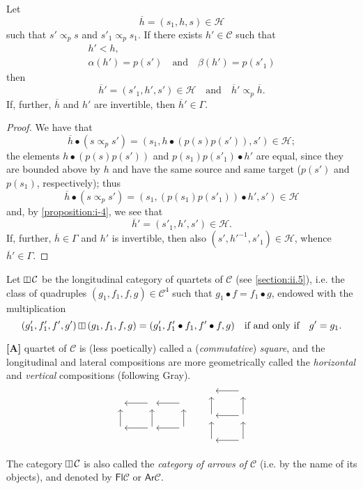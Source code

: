 \documentclass[a4paper,fleqn]{article}
\theoremstyle{plain}
\newenvironment{proposition}[1]
  {\renewcommand\theinnerproposition{#1}\innerproposition}
  {\endinnerproposition}
\theoremstyle{definition}
\newenvironment{longcomm}[1]
  {\noindent\textbf{[#1]}\rmfamily}
  {}
\newcommand{\oldpage}[1]{{\marginpar{\footnotesize$\bigg\vert$\,\,\,\,\textit{p.~#1}}}}
\newcommand{\textand}{\quad\text{and}\quad}
\newcommand{\CC}{\mathcal{C}}
\newcommand{\HH}{\mathcal{H}}
\newcommand{\subs}{\mathrel{\propto}}
\newcommand{\vsqbox}{{\rotatebox{90}{$\boxminus$}}}
\DeclareMathOperator{\vsq}{\raisebox{-.1em}{$\vsqbox$}}
\newcommand{\vmult}{\mathbin{\raisebox{-.1em}{$\vsqbox$}}}
\begin{document}
\begin{proposition}{7}
\label{proposition:i-7}
  Let
  \[
    \overline{h}
    = (s_1,h,s)
    \in\HH
  \]
  such that $s'\subs_p s$ and $s'_1\subs_p s_1$.
  If there exists $h'\in\CC$ such that
  \[
    \begin{gathered}
      h'<h,
    \\\alpha(h')=p(s')
      \textand
      \beta(h')=p(s'_1)
    \end{gathered}
  \]
  then
  \[
    \overline{h}'
    =(s'_1,h',s')
    \in\HH
    \textand
    \overline{h}'\subs_p\overline{h}.
  \]
  If, further, $\overline{h}$ and $h'$ are invertible, then $\overline{h}'\in\Gamma$.
\end{proposition}

\begin{proof}
  We have that
  \[
    \overline{h}\bullet(s\subs_p s')
    = (s_1,h\bullet(p(s)p(s')),s')
    \in\HH;
  \]
  the elements $h\bullet(p(s)p(s'))$ and $p(s_1)p(s'_1)\bullet h'$ are equal, since they are bounded above by $h$ and have the same source and same target ($p(s')$ and $p(s_1)$, respectively);
  thus
  \[
    \overline{h}\bullet(s\subs_p s')
    = (s_1,(p(s_1)p(s'_1))\bullet h',s')
    \in\HH
  \]
  and, by \cref{proposition:i-4}, we see that
  \[
    \overline{h}'
    = (s'_1,h',s')
    \in\HH.
  \]
  \oldpage{365}
  If, further, $\overline{h}\in\Gamma$ and $h'$ is invertible, then also $(s',h'^{-1},s'_1)\in\HH$, whence $\overline{h}'\in\Gamma$.
\end{proof}

Let $\vsq\CC$ be the longitudinal category of quartets of $\CC$ (see \cref{section:ii.5}), i.e. the class of quadruples $(g_1,f_1,f,g)\in\CC^4$ such that $g_1\bullet f=f_1\bullet g$, endowed with the multiplication
\[
  (g'_1,f'_1,f',g')\vmult(g_1,f_1,f,g)
  = (g'_1,f'_1\bullet f_1,f'\bullet f,g)
  \quad\text{if and only if}\quad
  g'=g_1.
\]

\begin{longcomm}{37.1}
  A quartet of $\CC$ is (less poetically) called a (\emph{commutative}) \emph{square}, and the longitudinal and lateral compositions are more geometrically called the \emph{horizontal} and \emph{vertical} compositions (following Gray).
  \[
    \begin{tikzcd}
      {}
      &{} \ar[l]
      &{} \ar[l]
    \\{} \ar[u]
      &{} \ar[l] \ar[u]
      &{} \ar[l] \ar[u]
    \end{tikzcd}
    \qquad
    \begin{tikzcd}
      {}
      & \ar[l]
    \\{} \ar[u]
      & \ar[l] \ar[u]
    \\{} \ar[u]
      & \ar[l] \ar[u]
    \end{tikzcd}
  \]

  The category $\vsq\CC$ is also called the \emph{category of arrows of $\CC$} (i.e. by the name of its objects), and denoted by $\mathsf{Fl}\CC$ or $\mathsf{Ar}\CC$.
\end{longcomm}
\end{document}
